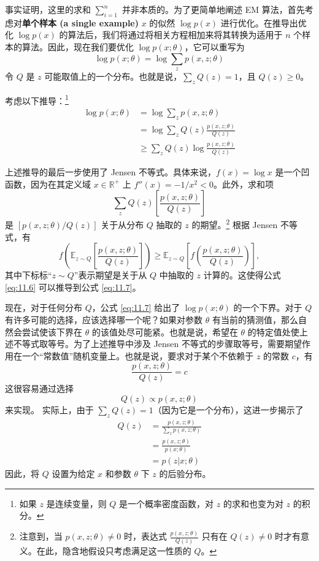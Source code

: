 事实证明，这里的求和 $\sum_{i=1}^n$ 并非本质的。为了更简单地阐述 EM 算法，首先考虑对\textbf{单个样本 (a single example)} $x$ 的似然 $\log p(x)$ 进行优化。在推导出优化 $\log p(x)$ 的算法后，我们将通过将相关方程相加来将其转换为适用于 $n$ 个样本的算法。因此，现在我们要优化 $\log p(x; \theta)$，它可以重写为
\begin{equation}
    \log p(x; \theta) = \log \sum_z p(x, z; \theta)
    \label{eq:11.5}
\end{equation}
令 $Q$ 是 $z$ 可能取值上的一个分布。也就是说，$\sum_z Q(z) = 1$，且 $Q(z) \geq 0$。

考虑以下推导：\footnote{如果 $z$ 是连续变量，则 $Q$ 是一个概率密度函数，对 $z$ 的求和也变为对 $z$ 的积分。}
\begin{align}
    \log p(x; \theta) &= \log \sum_z p(x, z; \theta) \nonumber \\
    &= \log \sum_z Q(z) \frac{p(x, z; \theta)}{Q(z)}
    \label{eq:11.6} \\
    &\geq \sum_z Q(z) \log \frac{p(x, z; \theta)}{Q(z)}
    \label{eq:11.7}
\end{align}

上述推导的最后一步使用了 Jensen 不等式。具体来说，$f(x) = \log x$ 是一个凹函数，因为在其定义域 $x\in \mathbb{R}^+$ 上 $f''(x) = -1/x^2 < 0$。此外，求和项
\[
    \sum_z Q(z) \left[ \frac{p(x, z; \theta)}{Q(z)} \right]
\]
是 $[p(x, z; \theta)/Q(z)]$ 关于从分布 $Q$ 抽取的 $z$ 的期望。\footnote{注意到，当 $p(x, z; \theta) \neq 0$ 时，表达式 $\frac{p(x, z; \theta)}{Q(z)}$ 只有在 $Q(z) \neq 0$ 时才有意义。在此，隐含地假设只考虑满足这一性质的 $Q$。} 根据 Jensen 不等式，有
\[
    f\left( \mathbb{E}_{z \sim Q}\left[ \frac{p(x, z; \theta)}{Q(z)} \right] \right) \geq \mathbb{E}_{z \sim Q}\left[ f\left( \frac{p(x, z; \theta)}{Q(z)} \right) \right],
\]
其中下标标“$z \sim Q$”表示期望是关于从 $Q$ 中抽取的 $z$ 计算的。这使得公式 \eqref{eq:11.6} 可以推导到公式 \eqref{eq:11.7}。

现在，对于任何分布 $Q$，公式 \eqref{eq:11.7} 给出了 $\log p(x; \theta)$ 的一个下界。对于 $Q$ 有许多可能的选择，应该选择哪一个呢？如果对参数 $\theta$ 有当前的猜测值，那么自然会尝试使该下界在 $\theta$ 的该值处尽可能紧。也就是说，希望在 $\theta$ 的特定值处使上述不等式取等号。为了上述推导中涉及 Jensen 不等式的步骤取等号，需要期望作用在一个“常数值”随机变量上。也就是说，要求对于某个不依赖于 $z$ 的常数 $c$，有
\[
    \frac{p(x, z; \theta)}{Q(z)} = c
\]
这很容易通过选择
\[
    Q(z) \propto p(x, z; \theta)
\]
来实现。
实际上，由于 $\sum_z Q(z) = 1$（因为它是一个分布），这进一步揭示了
\begin{align}
    Q(z) &= \frac{p(x, z; \theta)}{\sum_z p(x, z; \theta)}
    \nonumber\\
    &= \frac{p(x, z; \theta)}{p(x; \theta)} 
    \nonumber\\
    &= p(z|x; \theta)
    \label{eq:11.8}
\end{align}
因此，将 $Q$ 设置为给定 $x$ 和参数 $\theta$ 下 $z$ 的后验分布。

